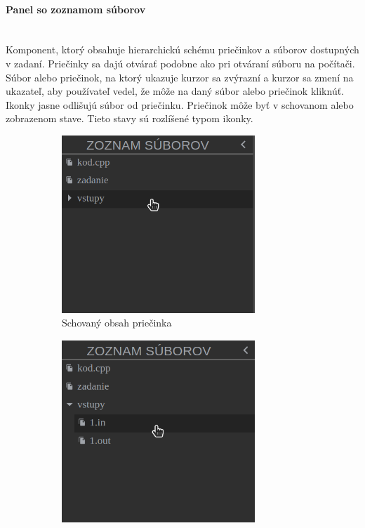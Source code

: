 \paragraph{Panel so zoznamom súborov}\leavevmode\\
Komponent, ktorý obsahuje hierarchickú schému priečinkov a súborov dostupných v zadaní. Priečinky sa
dajú otvárať podobne ako pri otváraní súboru na počítači. Súbor alebo priečinok, na ktorý ukazuje
kurzor sa zvýrazní a kurzor sa zmení na ukazateľ, aby používateľ vedel, že môže na daný súbor
alebo priečinok kliknúť. Ikonky jasne odlišujú súbor od priečinku. Priečinok môže byť v schovanom
alebo zobrazenom stave. Tieto stavy sú rozlíšené typom ikonky.
\begin{figure}[H]
\centering
\begin{subfigure}{.5\textwidth}
  \centering
  \includegraphics[width=0.8\textwidth]{images/schovany_zoznam}
  \caption[Schovaný obsah priečinka]{Schovaný obsah priečinka}
  \label{obr:schovany_zoznam}
\end{subfigure}%
\begin{subfigure}{.5\textwidth}
  \centering
  \includegraphics[width=0.8\textwidth]{images/zobrazeny_zoznam}

\end{subfigure}
\end{figure}
